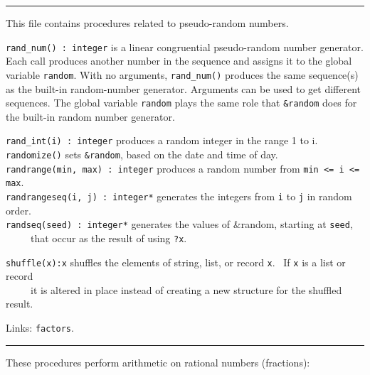 \vspace{0.25cm}\hrule{}

This file contains procedures related to pseudo-random numbers.

\texttt{rand\_num() : integer} is a linear congruential pseudo-random
number generator. Each call produces
another number in the sequence and assigns it to the global
variable \texttt{random}. With no arguments, \texttt{rand\_num()}
produces the same sequence(s) as the built-in
random-number generator. Arguments can
be used to get different sequences. The global variable \texttt{random}
plays the same role that \texttt{\&random} does for
the built-in random
number generator.

\texttt{rand\_int(i) : integer} produces a random integer in the range 1
to i.\\
\texttt{randomize()} sets \texttt{\&random}, based on the
date and time of day. \\
\texttt{randrange(min, max) : integer} produces a random number from
\texttt{min {\textless}= i {\textless}= max}.\\
\texttt{randrangeseq(i, j) : integer*} generates the integers from
\texttt{i} to \texttt{j} in random order.\\
\texttt{randseq(seed) : integer*} generates the values of \&random,
starting at \texttt{seed},\\
 \ \ \ \ \ that occur as the result of using \texttt{?x}.

\texttt{shuffle(x):x} shuffles the elements of string, list, or record
\texttt{x}. \ If \texttt{x} is a list or record\\
 \ \ \ \ \ it is altered in place instead of creating a new structure for
the shuffled result.

Links: \texttt{factors}.

\vspace{0.25cm}\hrule{}

These procedures perform arithmetic on rational
numbers (fractions):

